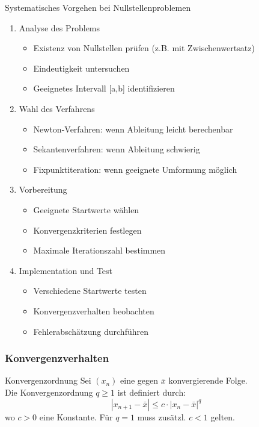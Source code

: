 \begin{KR}{Systematisches Vorgehen bei Nullstellenproblemen}
\begin{enumerate}
    \item Analyse des Problems
    \begin{itemize}
        \item Existenz von Nullstellen prüfen (z.B. mit Zwischenwertsatz)
        \item Eindeutigkeit untersuchen
        \item Geeignetes Intervall [a,b] identifizieren
    \end{itemize}
    
    \item Wahl des Verfahrens
    \begin{itemize}
        \item Newton-Verfahren: wenn Ableitung leicht berechenbar
        \item Sekantenverfahren: wenn Ableitung schwierig
        \item Fixpunktiteration: wenn geeignete Umformung möglich
    \end{itemize}
    
    \item Vorbereitung
    \begin{itemize}
        \item Geeignete Startwerte wählen
        \item Konvergenzkriterien festlegen
        \item Maximale Iterationszahl bestimmen
    \end{itemize}
    
    \item Implementation und Test
    \begin{itemize}
        \item Verschiedene Startwerte testen
        \item Konvergenzverhalten beobachten
        \item Fehlerabschätzung durchführen
    \end{itemize}
\end{enumerate}
\end{KR}



\subsubsection{Konvergenzverhalten}

\begin{definition}{Konvergenzordnung}
    Sei $(x_n)$ eine gegen $\bar{x}$ konvergierende Folge. \\
    Die Konvergenzordnung $q \geq 1$ ist definiert durch:
    \vspace{-2mm}\\
    $$|x_{n+1}-\bar{x}| \leq c \cdot |x_n-\bar{x}|^q$$
    wo $c > 0$ eine Konstante. Für $q = 1$ muss zusätzl. $c < 1$ gelten.
\end{definition}

